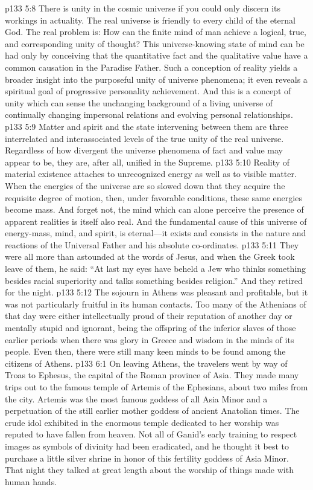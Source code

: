 \vs p133 5:8 There is unity in the cosmic universe if you could only discern its workings in actuality. The real universe is friendly to every child of the eternal God. The real problem is: How can the finite mind of man achieve a logical, true, and corresponding unity of thought? This universe\hyp{}knowing state of mind can be had only by conceiving that the quantitative fact and the qualitative value have a common causation in the Paradise Father. Such a conception of reality yields a broader insight into the purposeful unity of universe phenomena; it even reveals a spiritual goal of progressive personality achievement. And this is a concept of unity which can sense the unchanging background of a living universe of continually changing impersonal relations and evolving personal relationships.
\vs p133 5:9 Matter and spirit and the state intervening between them are three interrelated and interassociated levels of the true unity of the real universe. Regardless of how divergent the universe phenomena of fact and value may appear to be, they are, after all, unified in the Supreme.
\vs p133 5:10 Reality of material existence attaches to unrecognized energy as well as to visible matter. When the energies of the universe are so slowed down that they acquire the requisite degree of motion, then, under favorable conditions, these same energies become mass. And forget not, the mind which can alone perceive the presence of apparent realities is itself also real. And the fundamental cause of this universe of energy\hyp{}mass, mind, and spirit, is eternal---it exists and consists in the nature and reactions of the Universal Father and his absolute co\hyp{}ordinates.
\pc \vs p133 5:11 They were all more than astounded at the words of Jesus, and when the Greek took leave of them, he said: “At last my eyes have beheld a Jew who thinks something besides racial superiority and talks something besides religion.” And they retired for the night.
\vs p133 5:12 The sojourn in Athens was pleasant and profitable, but it was not particularly fruitful in its human contacts. Too many of the Athenians of that day were either intellectually proud of their reputation of another day or mentally stupid and ignorant, being the offspring of the inferior slaves of those earlier periods when there was glory in Greece and wisdom in the minds of its people. Even then, there were still many keen minds to be found among the citizens of Athens.
\vs p133 6:1 On leaving Athens, the travelers went by way of Troas to Ephesus, the capital of the Roman province of Asia. They made many trips out to the famous temple of Artemis of the Ephesians, about two miles from the city. Artemis was the most famous goddess of all Asia Minor and a perpetuation of the still earlier mother goddess of ancient Anatolian times. The crude idol exhibited in the enormous temple dedicated to her worship was reputed to have fallen from heaven. Not all of Ganid’s early training to respect images as symbols of divinity had been eradicated, and he thought it best to purchase a little silver shrine in honor of this fertility goddess of Asia Minor. That night they talked at great length about the worship of things made with human hands.
